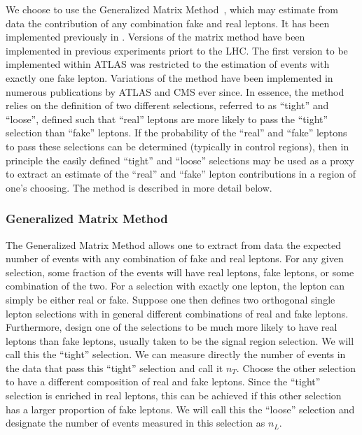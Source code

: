 We choose to use the Generalized Matrix Method~\cite{Gillam:2014xua}, 
which may estimate from data the contribution of any combination
fake and real leptons. It has been implemented previously in 
\cite{Arguin:1558979}. Versions of the matrix
method have been implemented in previous experiments priort to the LHC.
The first version to be implemented within ATLAS
\cite{ATLAS-CONF-2010-087}
was restricted to the estimation of events with 
exactly one fake lepton.
Variations of the method have been implemented in numerous publications
by ATLAS and CMS ever since. %
In essence, the method relies on the definition of two different selections,
referred to as ``tight'' and ``loose'', defined such that
``real'' leptons are more likely to pass the ``tight'' selection
than ``fake'' leptons. If the probability of the ``real'' and 
``fake'' leptons to pass these selections can be determined (typically
in control regions), 
then in principle the easily defined
``tight'' and ``loose'' selections may be used
as a proxy
to extract an estimate of the 
``real'' and ``fake'' lepton
contributions in a region of one's choosing.
The method is described in more detail below.



\subsubsection{Generalized Matrix Method}
\label{sec:mxm}

The Generalized Matrix Method allows one to extract from data the expected
number of events with any combination of fake and real leptons.
For any given selection, some fraction of the events will have 
real leptons, fake leptons, or some combination of the two.
For a selection with exactly one lepton, the lepton 
can simply be either real or fake.  Suppose one then defines
two orthogonal single lepton
selections with in general different combinations of real and fake leptons.
Furthermore, design one of the selections to be much more likely to have
real leptons than fake leptons, usually taken 
to be the signal region selection. We will call this the ``tight'' selection.
We can measure directly the number of events in the data that
pass this ``tight'' selection and call it $n_T$. Choose the other selection
to have a different composition of real and fake leptons. Since the 
``tight'' selection is enriched in real leptons, this can be achieved
if this other selection has a larger proportion of fake leptons.
We will call this the
``loose'' selection and designate the number of events measured
in this selection as $n_L$. 

